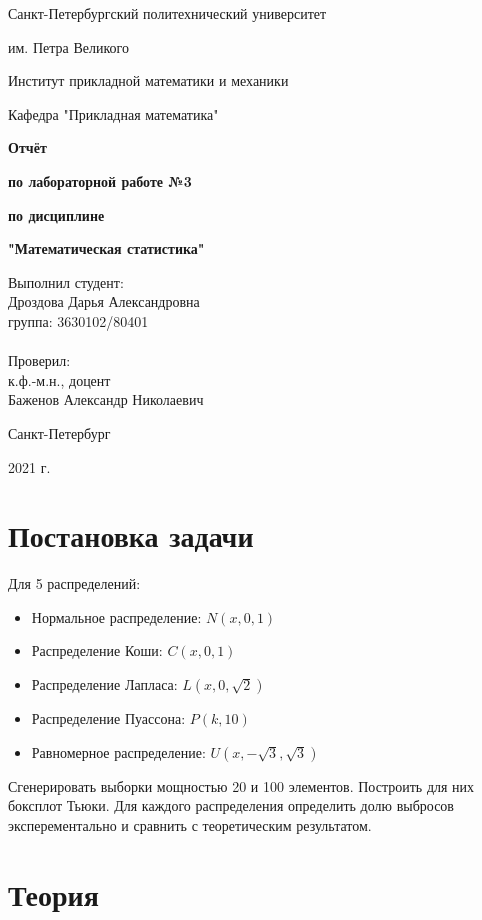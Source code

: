 \documentclass{article}
\begin{document}
\begin{titlepage}
  \thispagestyle{empty}
  \centerline {Санкт-Петербургский политехнический университет}
  \centerline { им. Петра Великого}
  \centerline { }
  \centerline {Институт прикладной математики и механики} 
  \centerline {Кафедра "Прикладная математика"}
  \vfill
  \centerline{\textbf{Отчёт}}
  \centerline{\textbf{по лабораторной работе №3}}
  \centerline{\textbf{по дисциплине}}
  \centerline{\textbf{"Математическая статистика"}}
  \vfill
  \hfill
  \begin{minipage}{0.45\textwidth}
  Выполнил студент:\\
  Дроздова Дарья Александровна\\
  группа: 3630102/80401 \\
  \\
  Проверил:\\
  к.ф.-м.н., доцент \\
  Баженов Александр Николаевич
  \end{minipage}
  \vfill
  \centerline {Санкт-Петербург}   
  \centerline {2021 г.}  
\end{titlepage}

\newpage
\setcounter{page}{2}
\tableofcontents

\newpage
\listoftables

\newpage
\listoffigures

\newpage
\section{Постановка задачи}
Для 5 распределений:
  \begin{itemize}
    \item Нормальное распределение: $N(x,0,1)$
    \item Распределение Коши: $C(x,0,1)$
    \item Распределение Лапласа: $L(x,0,\sqrt{2})$
    \item Распределение Пуассона: $P(k,10)$
    \item Равномерное распределение: $U(x,-\sqrt{3}, \sqrt{3})$
  \end{itemize}
Сгенерировать выборки мощностью 20 и 100 элементов. Построить для них боксплот Тьюки. Для каждого распределения определить долю выбросов эксперементально и сравнить с теоретическим результатом.

\newpage
\section{Теория}
\end{document}
